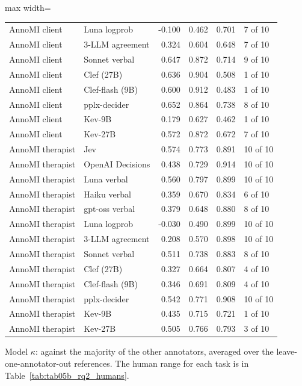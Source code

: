 \begin{table}[t]
\begin{adjustbox}{max width=\linewidth}
\begin{tabular}{llrrrl}
AnnoMI client & Luna logprob & -0.100 & 0.462 & 0.701 & 7 of 10 \\
AnnoMI client & 3-LLM agreement & 0.324 & 0.604 & 0.648 & 7 of 10 \\
AnnoMI client & Sonnet verbal & 0.647 & 0.872 & 0.714 & 9 of 10 \\
AnnoMI client & Clef (27B) & 0.636 & 0.904 & 0.508 & 1 of 10 \\
AnnoMI client & Clef-flash (9B) & 0.600 & 0.912 & 0.483 & 1 of 10 \\
AnnoMI client & pplx-decider & 0.652 & 0.864 & 0.738 & 8 of 10 \\
AnnoMI client & Kev-9B & 0.179 & 0.627 & 0.462 & 1 of 10 \\
AnnoMI client & Kev-27B & 0.572 & 0.872 & 0.672 & 7 of 10 \\
AnnoMI therapist & Jev & 0.574 & 0.773 & 0.891 & 10 of 10 \\
AnnoMI therapist & OpenAI Decisions & 0.438 & 0.729 & 0.914 & 10 of 10 \\
AnnoMI therapist & Luna verbal & 0.560 & 0.797 & 0.899 & 10 of 10 \\
AnnoMI therapist & Haiku verbal & 0.359 & 0.670 & 0.834 & 6 of 10 \\
AnnoMI therapist & gpt-oss verbal & 0.379 & 0.648 & 0.880 & 8 of 10 \\
AnnoMI therapist & Luna logprob & -0.030 & 0.490 & 0.899 & 10 of 10 \\
AnnoMI therapist & 3-LLM agreement & 0.208 & 0.570 & 0.898 & 10 of 10 \\
AnnoMI therapist & Sonnet verbal & 0.511 & 0.738 & 0.883 & 8 of 10 \\
AnnoMI therapist & Clef (27B) & 0.327 & 0.664 & 0.807 & 4 of 10 \\
AnnoMI therapist & Clef-flash (9B) & 0.346 & 0.691 & 0.809 & 4 of 10 \\
AnnoMI therapist & pplx-decider & 0.542 & 0.771 & 0.908 & 10 of 10 \\
AnnoMI therapist & Kev-9B & 0.435 & 0.715 & 0.721 & 1 of 10 \\
AnnoMI therapist & Kev-27B & 0.505 & 0.766 & 0.793 & 3 of 10 \\
\bottomrule
\end{tabular}
\end{adjustbox}
\par\smallskip\footnotesize\raggedright Model $\kappa$: against the majority of the other annotators, averaged over the leave-one-annotator-out references. The human range for each task is in Table~\ref{tab:tab05b_rq2_humans}.
\end{table}
